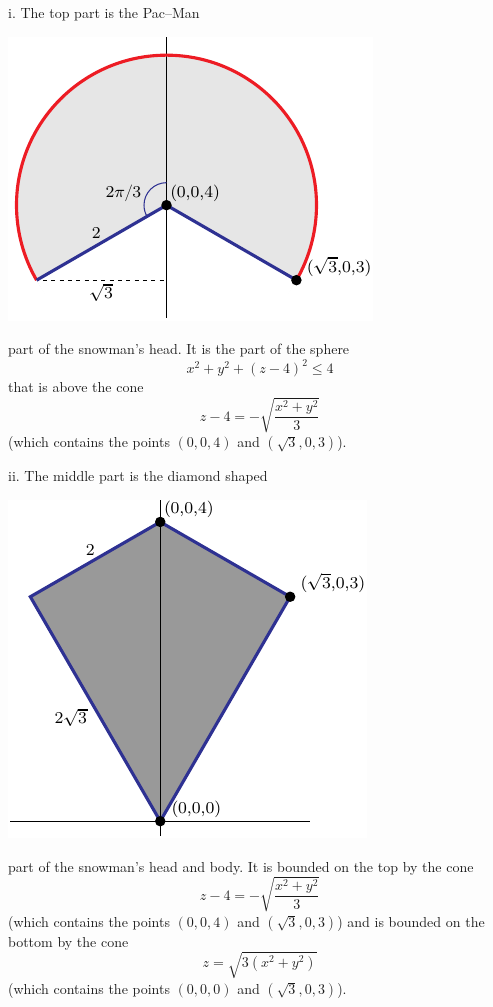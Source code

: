 \begin{solution}
i. The top part is the Pac--Man
\begin{center}
     \includegraphics{fig/OE11D_8d.pdf}
\end{center}
part of the snowman's head. It is the part of the sphere
\begin{equation*}
x^2+y^2+(z-4)^2\le 4
\end{equation*}
that is above the cone
\begin{equation*}
z-4 = - \sqrt{\frac{x^2+y^2}{3}}
\end{equation*}
(which contains the points $(0,0,4)$ and $(\sqrt{3},0,3)$).

ii. The middle part is the diamond shaped
\begin{center}
     \includegraphics{fig/OE11D_8e.pdf}
\end{center}
part of the snowman's head and body. It is bounded on the top by the  cone
\begin{equation*}
z-4 = - \sqrt{\frac{x^2+y^2}{3}}
\end{equation*}
(which contains the points $(0,0,4)$ and $(\sqrt{3},0,3)$) and
is bounded on the bottom by the  cone
\begin{equation*}
z = \sqrt{3(x^2+y^2)}
\end{equation*}
(which contains the points $(0,0,0)$ and $(\sqrt{3},0,3)$).


\end{solution}
